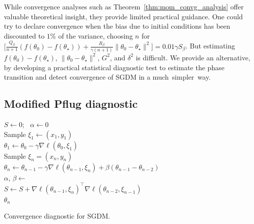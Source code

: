 \documentclass[conference]{IEEEtran}
\begin{document}
While convergence analyses such as Theorem~\ref{thm:mom_convg_analysis} offer valuable theoretical insight, they provide limited practical guidance. One could try to declare convergence when the bias due to initial conditions has been discounted to $1\%$ of the variance, 
choosing $n$ for 
$\biggl[ \frac{Q_\beta}{n+1} ( f ( \theta_0 ) - f ( \theta_\star ) ) + \frac{R_\beta}{\gamma ( n+1 )} \| \theta_0 - \theta_\star \|^2 \biggr] = 0.01  \gamma S_\beta$.
But estimating $f ( \theta_0 ) - f ( \theta_\star)$, $ \| \theta_0 - \theta_\star \|^2$, $G^2$, and $\delta^2$ is difficult.
We provide an alternative, by developing a practical statistical diagnostic test to estimate the phase transition and detect convergence of SGDM in a much~simpler~way.

\subsection{Modified Pflug diagnostic}


\begin{algorithm}[ht]
\Input{Initial point $\theta_0$,
data $\{ (x_1,y_1)$, $(x_2,y_2)$, $\dots \}$,
$\gamma > 0$, 
$\beta \in [0,1)$,
final momentum $\beta' \in [0, \beta)$, heuristic convergence $h$, 
threshold $T>0$, checking period $c>0$,
$\tt{burnin} > 0$.
}
$S \gets 0$; \ 
$\alpha \gets 0$ \\
Sample $\xi_1 \gets (x_1, y_1)$ \\
$\theta_1 \gets \theta_0 - \gamma \nabla \ell (\theta_0, \xi_1)$ \\
\For {$n \in \{2,3,\dots\}$} {
Sample $\xi_n = (x_n, y_n)$ \\
$\theta_n \gets \theta_{n-1} - \gamma \nabla \ell (\theta_{n-1}, \xi_n) + \beta (\theta_{n-1} - \theta_{n-2})$ \\
$\alpha$, $\beta \gets$  \\
\If {$\alpha > 0$ and $n > \alpha + \tt{burnin}$} {
$S \gets S + \nabla \ell (\theta_{n-1}, \xi_n)^\top \nabla \ell (\theta_{n-2}, \xi_{n-1})$ 
\label{line:test_stat} \\
 {
\KwRet $\theta_n$
}
}
} 
\caption{Convergence diagnostic for SGDM.}
\label{alg:diagnostic}
\end{algorithm}
\end{document}

